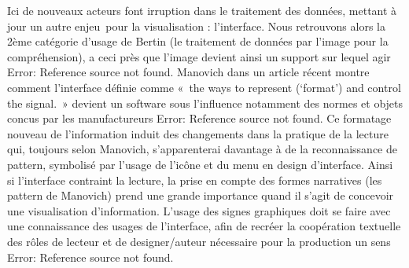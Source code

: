 Ici de nouveaux acteurs font irruption dans le traitement des données, mettant à jour un autre enjeu pour la visualisation : l’interface. Nous retrouvons alors la 2ème catégorie d’usage de Bertin (le traitement de données par l’image pour la compréhension), a ceci près que l’image devient ainsi un support sur lequel agir Error: Reference source not found. Manovich dans un article récent montre comment l’interface définie comme « the ways to represent (‘format’) and control the signal. » devient un software sous l’influence notamment des normes et objets concus par les manufactureurs Error: Reference source not found. Ce formatage nouveau de l’information induit des changements dans la pratique de la lecture qui, toujours selon Manovich, s’apparenterai davantage à de la reconnaissance de pattern, symbolisé par l’usage de l’icône et du menu en design d’interface. Ainsi si l’interface contraint la lecture, la prise en compte des formes narratives (les pattern de Manovich) prend une grande importance quand il s’agit de concevoir une visualisation d’information. L’usage des signes graphiques doit se faire avec une connaissance des usages de l’interface, afin de recréer la coopération textuelle des rôles de lecteur et de designer/auteur nécessaire pour la production un sens Error: Reference source not found. 


